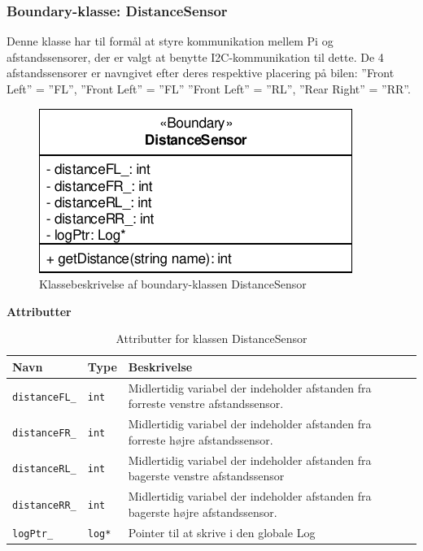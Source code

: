 \subsubsection{Boundary-klasse: DistanceSensor}

Denne klasse har til formål at styre kommunikation mellem Pi og afstandssensorer, der er valgt at benytte I2C-kommunikation til dette. De 4 afstandssensorer er navngivet efter deres respektive placering på bilen: ''Front Left'' = ''FL'', ''Front Left'' = ''FL'' ''Front Left'' = ''RL'', ''Rear Right'' = ''RR''. 

\begin{figure}[h]
\centering
\includegraphics[]{../fig/diagrammer/bil/cd_distancesensor.pdf}
\caption{Klassebeskrivelse af boundary-klassen DistanceSensor}
\label{fig:cd_distancesensor}
\end{figure}

\textbf{Attributter}

\begin{table}[h]
	\begin{tabularx}{\textwidth}{| Z | Z | L{10cm} |} \hline
		Navn & Type & Beskrivelse \\\hline
		\texttt{distanceFL\_} & \texttt{int} 		& Midlertidig variabel der indeholder afstanden fra forreste venstre afstandssensor.\\\hline
		\texttt{distanceFR\_} & \texttt{int} 		& Midlertidig variabel der indeholder afstanden fra forreste højre afstandssensor.	\\\hline
		\texttt{distanceRL\_} & \texttt{int} 		& Midlertidig variabel der indeholder afstanden fra bagerste venstre afstandssensor \\\hline
		\texttt{distanceRR\_} & \texttt{int} 		& Midlertidig variabel der indeholder afstanden fra bagerste højre afstandssensor.	\\\hline
		\texttt{logPtr\_} 	 & \texttt{log*} 		& Pointer til at skrive i den globale Log											\\\hline
	\end{tabularx}
	\caption{Attributter for klassen DistanceSensor}
	\label{table:attr_distancesensor}
\end{table}
\clearpage

